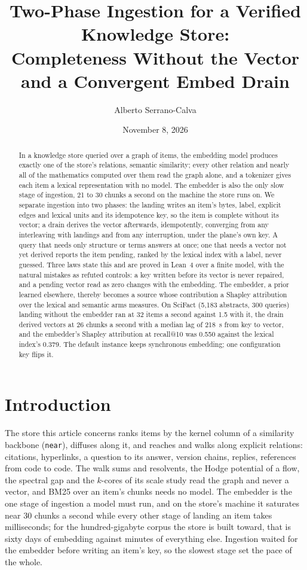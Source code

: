 \documentclass[11pt]{article}
\title{Two-Phase Ingestion for a Verified Knowledge Store:\\
Completeness Without the Vector and a Convergent Embed Drain}
\author{Alberto Serrano-Calva}
\date{November 8, 2026}
\theoremstyle{plain}
\theoremstyle{definition}
\theoremstyle{remark}
\newcommand{\code}[1]{\texttt{#1}}
\newcommand{\nItems}{5{,}183}
\newcommand{\nQueries}{300}
\newcommand{\lazyRate}{32}
\newcommand{\syncRate}{1.5}
\newcommand{\drainRate}{26}
\newcommand{\lagMedian}{218}
\newcommand{\shapE}{0.550}
\newcommand{\shapL}{0.379}
\begin{document}
\maketitle

\begin{abstract}
In a knowledge store queried over a graph of items, the embedding model produces exactly one of
the store's relations, semantic similarity; every other relation and nearly all of the mathematics
computed over them read the graph alone, and a tokenizer gives each item a lexical representation
with no model. The embedder is also the only slow stage of ingestion, 21 to 30 chunks a second on
the machine the store runs on. We separate ingestion into two phases: the landing writes an item's
bytes, label, explicit edges and lexical units and its idempotence key, so the item is complete
without its vector; a drain derives the vector afterwards, idempotently, converging from any
interleaving with landings and from any interruption, under the plane's own key. A query that
needs only structure or terms answers at once; one that needs a vector not yet derived reports
the item pending, ranked by the lexical index with a label, never guessed. Three laws state this
and are proved in Lean~4 over a finite model, with the natural mistakes as refuted controls: a key
written before its vector is never repaired, and a pending vector read as zero changes with the
embedding. The embedder, a prior learned elsewhere, thereby becomes a source whose contribution a
Shapley attribution over the lexical and semantic arms measures. On SciFact (\nItems{} abstracts,
\nQueries{} queries) landing without the embedder ran at \lazyRate{} items a second against
\syncRate{} with it, the drain derived vectors at \drainRate{} chunks a second with a median lag of
\lagMedian{}~s from key to vector, and the embedder's Shapley attribution at recall@10 was
\shapE{} against the lexical index's \shapL{}. The default instance keeps synchronous embedding;
one configuration key flips it.
\end{abstract}

\section{Introduction}

The store this article concerns ranks items by the kernel column of a similarity backbone
(\code{near}), diffuses along it, and reaches and walks along explicit relations: citations,
hyperlinks, a question to its answer, version chains, replies, references from code to code. The
walk sums and resolvents, the Hodge potential of a flow, the spectral gap and the $k$-cores of its
scale study read the graph and never a vector, and BM25 over an item's chunks
\citep{sparckjones1972,robertson2009bm25} needs no model. The embedder is the one stage of
ingestion a model must run, and on the store's machine it saturates near 30 chunks a second while
every other stage of landing an item takes milliseconds; for the hundred-gigabyte corpus the store
is built toward, that is sixty days of embedding against minutes of everything else. Ingestion
waited for the embedder before writing an item's key, so the slowest stage set the pace of the
whole.
\end{document}
